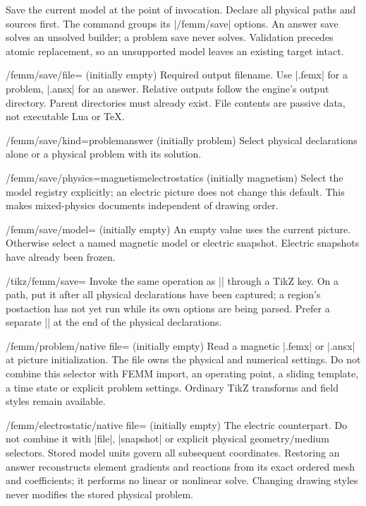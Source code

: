 \begin{command}{\femmsave{}}
Save the current model at the point of invocation. Declare all physical paths
and sources first. The command groups its |/femm/save| options. An answer save
solves an unsolved builder; a problem save never solves. Validation precedes
atomic replacement, so an unsupported model leaves an existing target intact.
\end{command}
\begin{key}{/femm/save/file= (initially empty)}
Required output filename. Use |.femx| for a problem, |.ansx| for an answer.
Relative outputs follow the engine's output directory. Parent directories must
already exist. File contents are passive data, not executable Lua or TeX.
\end{key}
\begin{key}{/femm/save/kind=problem\textbar answer (initially problem)}
Select physical declarations alone or a physical problem with its solution.
\end{key}
\begin{key}{/femm/save/physics=magnetism\textbar electrostatics (initially magnetism)}
Select the model registry explicitly; an electric picture does not change this
default. This makes mixed-physics documents independent of drawing order.
\end{key}
\begin{key}{/femm/save/model= (initially empty)}
An empty value uses the current picture. Otherwise select a named magnetic
model or electric snapshot. Electric snapshots have already been frozen.
\end{key}
\begin{key}{/tikz/femm/save=}
Invoke the same operation as |\femmsave| through a TikZ key. On a path, put it
after all physical declarations have been captured; a region's postaction has
not yet run while its own options are being parsed. Prefer a separate
|| at the end of the physical declarations.
\end{key}
\begin{key}{/femm/problem/native file= (initially empty)}
Read a magnetic |.femx| or |.ansx| at picture initialization. The file owns the
physical and numerical settings. Do not combine this selector with FEMM import,
an operating point, a sliding template, a time state or explicit problem settings.
Ordinary TikZ transforms and field styles remain available.
\end{key}
\begin{key}{/femm/electrostatic/native file= (initially empty)}
The electric counterpart. Do not combine it with |file|, |snapshot| or explicit
physical geometry/medium selectors. Stored model units govern all subsequent
coordinates. Restoring an answer reconstructs element gradients and reactions
from its exact ordered mesh and coefficients; it performs no linear or nonlinear
solve. Changing drawing styles never modifies the stored physical problem.
\end{key}

